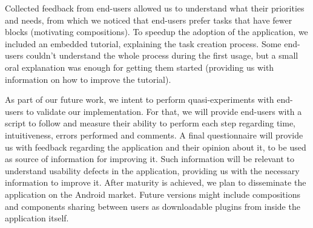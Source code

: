 \documentclass[9pt,a4paper]{extarticle}
\begin{document}
\begin{multicols}{2}
Collected feedback from end-users allowed us to understand what their priorities and needs, from which we noticed that end-users prefer tasks that have fewer blocks (motivating compositions). To speedup the adoption of the application, we included an embedded tutorial, explaining the task creation process. Some end-users couldn't understand the whole process during the first usage, but a small oral explanation was enough for getting them started (providing us with information on how to improve the tutorial).

As part of our future work, we intent to perform quasi-experiments with end-users to validate our implementation. For that, we will provide end-users with a script to follow and measure their ability to perform each step regarding time, intuitiveness, errors performed and comments. A final questionnaire will provide us with feedback regarding the application and their opinion about it, to be used as source of information for improving it. Such information will be relevant to understand usability defects in the application, providing us with the necessary information to improve it. After maturity is achieved, we plan to disseminate the application on the Android market. Future versions might include compositions and components sharing between users as downloadable plugins from inside the application itself.



\end{multicols}
\end{document}
